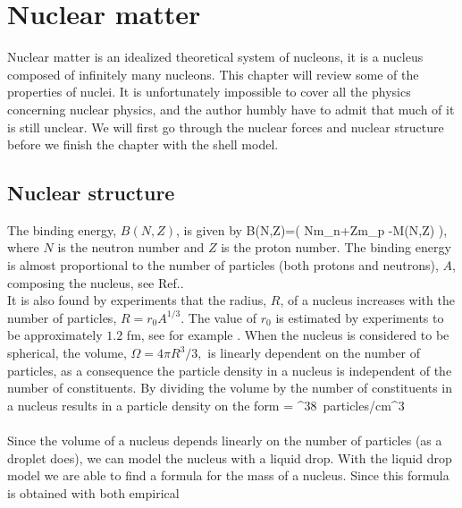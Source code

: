 \chapter{Nuclear matter} 

Nuclear matter is an idealized theoretical system of nucleons, it is a nucleus
composed of infinitely many nucleons. This chapter will review some of the
properties of  nuclei. It is unfortunately impossible to cover all the physics
concerning nuclear physics, and the author humbly have to admit that much of it 
is still unclear. We will first go through the nuclear forces and nuclear
structure before we finish the chapter with the shell model. 



\section{Nuclear structure} 
\label{sec:semiemp}
The binding energy, $B(N,Z)$, is given by
\be
B(N,Z)=\big( Nm_n+Zm_p -M(N,Z) \big),
\ee
where $N$ is the neutron number and $Z$ is the proton number. The binding energy
is almost proportional to the number of particles (both protons and neutrons), 
$A$, composing the nucleus, see Ref.\cite{siemenselementsnuclei}.\\
It is also found by experiments that the radius, $R$, of a nucleus increases with the number of particles, $R=r_0A^{1/3}.$ The value of $r_0$ is estimated by experiments to be approximately  $1.2$ fm, see for example \cite{kraneintro}. When the nucleus is considered to be spherical, the volume, 
$\Omega=4 \pi R^3/3,$ is linearly dependent on the number of particles, as a consequence the particle density in a nucleus is independent of the number of constituents. By dividing the volume by the number of constituents in a nucleus results in a particle density on the form
\be
{}= ^{38} \,\mbox{particles/cm}^3\\
\ee
\\
Since the volume of a nucleus depends linearly on the number of particles (as a droplet does), we can 
model the nucleus with a liquid drop. With the liquid drop model we are able to find a formula
for the mass of a nucleus.  Since this formula is obtained with both empirical
